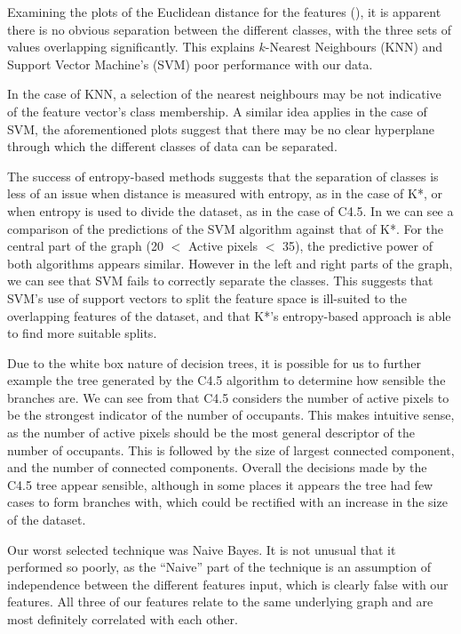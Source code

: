 \documentclass[../thesis/thesis.tex]{subfiles}
\begin{document}
Examining the plots of the Euclidean distance for the features (), it is apparent there is no obvious separation between the different classes, with the three sets of values overlapping significantly. This explains $k$-Nearest Neighbours (KNN) and Support Vector Machine's (SVM) poor performance with our data.

In the case of KNN, a selection of the nearest neighbours may be not indicative of the feature vector's class membership. A similar idea applies in the case of SVM, the aforementioned plots suggest that there may be no clear hyperplane through which the different classes of data can be separated.

The success of entropy-based methods suggests that the separation of classes is less of an issue when distance is measured with entropy, as in the case of K*, or when entropy is used to divide the dataset, as in the case of C4.5. In  we can see a comparison of the predictions of the SVM algorithm against that of K*. For the central part of the graph (20 $<$ Active pixels $<$ 35), the predictive power of both algorithms appears similar. However in the left and right parts of the graph, we can see that SVM fails to correctly separate the classes. This suggests that SVM's use of support vectors to split the feature space is ill-suited to the overlapping features of the dataset, and that K*'s entropy-based approach is able to find more suitable splits.

Due to the white box nature of decision trees, it is possible for us to further example the tree generated by the C4.5 algorithm  to determine how sensible the branches are. We can see from  that C4.5 considers the number of active pixels to be the strongest indicator of the number of occupants. This makes intuitive sense, as the number of active pixels should be the most general descriptor of the number of occupants. This is followed by the size of largest connected component, and the number of connected components. Overall the decisions made by the C4.5 tree appear sensible, although in some places it appears the tree had few cases to form branches with, which could be rectified with an increase in the size of the dataset.

Our worst selected technique was Naive Bayes. It is not unusual that it performed so poorly, as the ``Naive'' part of the technique is an assumption of independence between the different features input, which is clearly false with our features. All three of our features relate to the same underlying graph and are most definitely correlated with each other.
\end{document}
